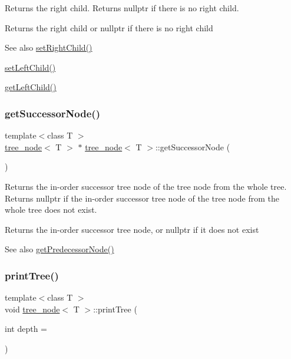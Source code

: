 Returns the right child. Returns nullptr if there is no right child. \begin{DoxyReturn}{Returns}
the right child or nullptr if there is no right child 
\end{DoxyReturn}
\begin{DoxySeeAlso}{See also}
\hyperlink{classtree__node_afea4c6595dafba65b5c4e59ca3da30f3}{set\+Right\+Child()} 

\hyperlink{classtree__node_a3db979969a0fe8505ba65c7afabb5463}{set\+Left\+Child()} 

\hyperlink{classtree__node_ae161b70a3780e0cb3ecd4b57acc9e2d1}{get\+Left\+Child()} 
\end{DoxySeeAlso}
\mbox{\label{classtree__node_a666b33dc3b2f3e2d2e4815cc4ec8b131}} 
\subsubsection{\texorpdfstring{get\+Successor\+Node()}{getSuccessorNode()}}
{\footnotesize\ttfamily template$<$class T $>$ \\
\hyperlink{classtree__node}{tree\+\_\+node}$<$ T $>$ $\ast$ \hyperlink{classtree__node}{tree\+\_\+node}$<$ T $>$\+::get\+Successor\+Node (\begin{DoxyParamCaption}{ }\end{DoxyParamCaption})}

Returns the in-\/order successor tree node of the tree node from the whole tree. Returns nullptr if the in-\/order successor tree node of the tree node from the whole tree does not exist. \begin{DoxyReturn}{Returns}
the in-\/order successor tree node, or nullptr if it does not exist 
\end{DoxyReturn}
\begin{DoxySeeAlso}{See also}
\hyperlink{classtree__node_a5cce6c37b00a6d899e371c334559310e}{get\+Predecessor\+Node()} 
\end{DoxySeeAlso}
\mbox{\label{classtree__node_a3a16e4e452fb27976139e59624d11846}} 
\subsubsection{\texorpdfstring{print\+Tree()}{printTree()}}
{\footnotesize\ttfamily template$<$class T $>$ \\
void \hyperlink{classtree__node}{tree\+\_\+node}$<$ T $>$\+::print\+Tree (\begin{DoxyParamCaption}\item[{int}]{depth = {} }\end{DoxyParamCaption})}

